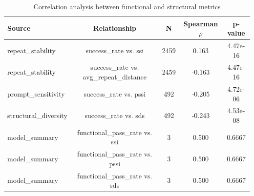 \begin{table}[t]
\centering
\caption{Correlation analysis between functional and structural metrics}
\label{tab:correlation_analysis}
\begin{tabular}{lcccc}
\toprule
Source & Relationship & N & Spearman $\rho$ & p-value \\
\midrule
repeat\_stability & success\_rate vs. ssi & 2459 & 0.163 & 4.47e-16 \\
repeat\_stability & success\_rate vs. avg\_repeat\_distance & 2459 & -0.163 & 4.47e-16 \\
prompt\_sensitivity & success\_rate vs. pssi & 492 & -0.205 & 4.72e-06 \\
structural\_diversity & success\_rate vs. sds & 492 & -0.243 & 4.53e-08 \\
model\_summary & functional\_pass\_rate vs. ssi & 3 & 0.500 & 0.6667 \\
model\_summary & functional\_pass\_rate vs. pssi & 3 & 0.500 & 0.6667 \\
model\_summary & functional\_pass\_rate vs. sds & 3 & 0.500 & 0.6667 \\
\bottomrule
\end{tabular}
\end{table}
